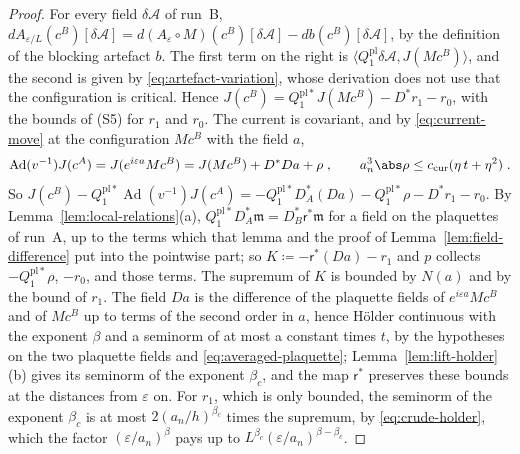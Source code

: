 \begin{proof}
For every field $\delta\mathcal A$ of run~B, $dA_{\varepsilon/L}(c^B)[\delta\mathcal A] = d(A_\varepsilon \circ M)(c^B)[\delta\mathcal A] - db(c^B)[\delta\mathcal A]$, by the definition of the blocking artefact $b$. The first term on the right is $\langle Q^{\mathrm{pl}}_1\delta\mathcal A, J(Mc^B)\rangle$, and the second is given by \eqref{eq:artefact-variation}, whose derivation does not use that the configuration is critical. Hence $J(c^B) = Q^{\mathrm{pl}*}_1J(Mc^B) - D^*r_1 - r_0$, with the bounds of (S5) for $r_1$ and $r_0$. The current is covariant, and by \eqref{eq:current-move} at the configuration $Mc^B$ with the field $a$,
\[
    \operatorname{Ad}(v^{-1})J(c^A) = J(e^{i\varepsilon a}Mc^B) = J(Mc^B) + D^*Da + \rho\;,
    \qquad
    a_n^3\abs\rho \leq c_{\mathrm{cur}}(\eta\,t + \eta^2)\;.
\]
So $J(c^B) - Q^{\mathrm{pl}*}_1\operatorname{Ad}(v^{-1})J(c^A) = -Q^{\mathrm{pl}*}_1D^*_A(Da) - Q^{\mathrm{pl}*}_1\rho - D^*r_1 - r_0$. By Lemma~\ref{lem:local-relations}(a), $Q^{\mathrm{pl}*}_1D_A^*\mathfrak m = D_B^*\mathsf r^*\mathfrak m$ for a field on the plaquettes of run~A, up to the terms which that lemma and the proof of Lemma~\ref{lem:field-difference} put into the pointwise part; so $K \coloneqq -\mathsf r^*(Da) - r_1$ and $p$ collects $-Q^{\mathrm{pl}*}_1\rho$, $-r_0$, and those terms. The supremum of $K$ is bounded by $N(a)$ and by the bound of $r_1$. The field $Da$ is the difference of the plaquette fields of $e^{i\varepsilon a}Mc^B$ and of $Mc^B$ up to terms of the second order in $a$, hence H\"older continuous with the exponent $\beta$ and a seminorm of at most a constant times $t$, by the hypotheses on the two plaquette fields and \eqref{eq:averaged-plaquette}; Lemma~\ref{lem:lift-holder}(b) gives its seminorm of the exponent $\beta_c$, and the map $\mathsf r^*$ preserves these bounds at the distances from $\varepsilon$ on. For $r_1$, which is only bounded, the seminorm of the exponent $\beta_c$ is at most $2(a_n/h)^{\beta_c}$ times the supremum, by \eqref{eq:crude-holder}, which the factor $(\varepsilon/a_n)^\beta$ pays up to $L^{\beta_c}(\varepsilon/a_n)^{\beta-\beta_c}$.
\end{proof}


